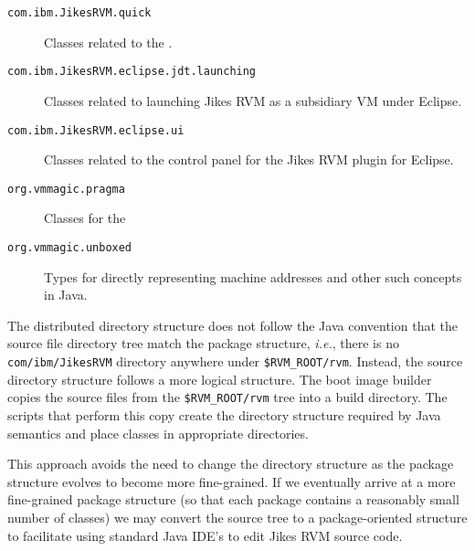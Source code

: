 \begin{description}
\item[\texttt{com.ibm.JikesRVM.quick}] Classes related to
the .

\item[\texttt{com.ibm.JikesRVM.eclipse.jdt.launching}] Classes related
to launching Jikes RVM as a subsidiary VM under Eclipse. 

\item[\texttt{com.ibm.JikesRVM.eclipse.ui}] Classes related
to the control panel for the Jikes RVM plugin for Eclipse.

\item[\texttt{org.vmmagic.pragma}] Classes for the 


\item[\texttt{org.vmmagic.unboxed}] Types for directly representing
machine addresses and other such concepts in Java.


\end{description}

The distributed directory structure
does not follow the Java\TMweb{} convention that the source file directory tree
match the package structure, {\it i.e.},
there is no {\tt com/ibm/JikesRVM} directory anywhere under \texttt{\$RVM\_ROOT/rvm}.  Instead, the source directory structure follows a more logical 
structure.  The boot image builder
copies the source files from the \texttt{\$RVM\_ROOT/rvm} tree into a build
directory.  The scripts that perform this copy create the directory
structure required by Java semantics and place classes in appropriate
directories.

This approach avoids the need to change the directory structure as the
package structure evolves to become more fine-grained. If we
eventually arrive at a more fine-grained package structure (so that
each package contains a reasonably small number of classes) we may
convert the source tree to a package-oriented structure to facilitate
using standard Java IDE's to edit Jikes RVM source code.
